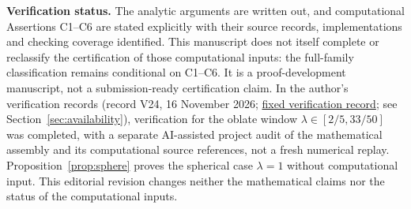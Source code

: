 \documentclass[11pt,a4paper]{article}
\numberwithin{equation}{section}
\theoremstyle{definition}
\theoremstyle{remark}
\begin{document}
\noindent\textbf{Verification status.}
The analytic arguments are written out, and computational Assertions C1--C6
are stated explicitly with their source records, implementations and checking
coverage identified. This manuscript does not itself complete or reclassify
the certification of those computational inputs: the full-family
classification remains conditional on C1--C6. It is a proof-development
manuscript, not a submission-ready certification claim. In the author's
verification records (record V24, 16 November 2026;
\href{https://github.com/cotaxxxx/bg-spheroid-family/blob/127be52046e9498d1306fe3d35c3e02e91c636de/runs/2026-11-16/D_OB_GLOBAL_CLOSED_V24/JUDGE_RULING_D_OB_GLOBAL_CLOSED_20261116.md}{fixed verification record}; see
Section~\ref{sec:availability}), verification for the oblate window
$\lambda\in[2/5,33/50]$ was completed, with a separate
AI-assisted project audit of the mathematical assembly and its
computational source references, not a fresh numerical replay.
Proposition~\ref{prop:sphere} proves the
spherical case $\lambda=1$ without computational input. This editorial
revision changes neither the mathematical claims nor the status of the
computational inputs.
\clearpage
\tableofcontents
\clearpage




\begingroup
{}


\endgroup
\end{document}
